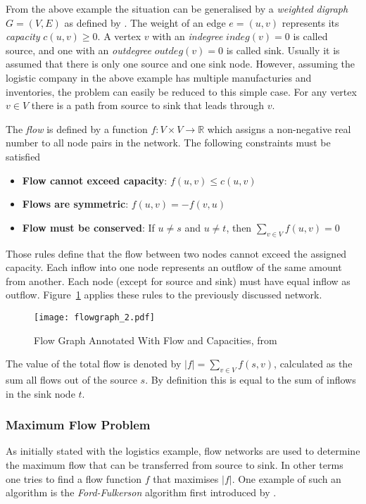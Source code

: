 \documentclass[final]{fhnwreport}       %
\begin{document}
From the above example the situation can be generalised by a \emph{weighted digraph} $G=(V,E)$ as defined by \cite{brossard_graph_2010}. The weight of an edge $e=(u,v)$ represents its \emph{capacity} $c(u,v)\geq0$. A vertex $v$ with an \emph{indegree} $indeg(v)=0$ is called source, and one with an \emph{outdegree} $outdeg(v)=0$ is called sink. Usually it is assumed that there is only one source and one sink node. However, assuming the logistic company in the above example has multiple manufacturies and inventories, the problem can easily be reduced to this simple case. For any vertex $v \in V$ there is a path from source to sink that leads through $v$.

The \emph{flow} is defined by a function $f : V \times V \rightarrow \mathbb{R}$ which assigns a non-negative real number to all node pairs in the network. The following constraints must be satisfied
\begin{itemize}
  \item \textbf{Flow cannot exceed capacity}:
  $f(u,v) \leq c(u,v)$
  \item \textbf{Flows are symmetric}:
  $f(u,v) = -f(v,u)$
  \item \textbf{Flow must be conserved}: If $u \neq s$ and $u \neq t$, then $\displaystyle{\sum_{v \in V}f(u,v)}=0$
\end{itemize}

Those rules define that the flow between two nodes cannot exceed the assigned capacity. Each inflow into one node represents an outflow of the same amount from another. Each node (except for source and sink) must have equal inflow as outflow. Figure~\ref{fig:flow_graph_2} applies these rules to the previously discussed network.

\begin{figure}[H]
\centering
\texttt{[image: flowgraph\_2.pdf]}
\caption{Flow Graph Annotated With Flow and Capacities, from \cite{brossard_graph_2010}}
\label{fig:flow_graph_2}
\end{figure}

The value of the total flow is denoted by $|f|=\displaystyle{\sum_{v \in V} f(s,v)}$, calculated as the sum all flows out of the source $s$. By definition this is equal to the sum of inflows in the sink node $t$.

\subsubsection{Maximum Flow Problem}\label{subsubsec:maxflow}
As initially stated with the logistics example, flow networks are used to determine the maximum flow that can be transferred from source to sink. In other terms one tries to find a flow function $f$ that maximises $|f|$. One example of such an algorithm is the \emph{Ford-Fulkerson} algorithm first introduced by \textcite{ford_maximal_1956}.
\end{document}
